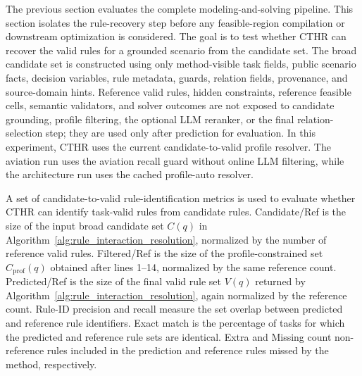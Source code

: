 ﻿\documentclass[a4paper,fleqn]{cas-dc}
\newcommand{\CTHR}{\textsc{CTHR}}
\begin{document}
The previous section evaluates the complete modeling-and-solving pipeline. This
section isolates the rule-recovery step before any feasible-region compilation
or downstream optimization is considered. The goal is to test whether \CTHR{}
can recover the valid rules for a grounded scenario from the candidate set. The
broad candidate set is constructed using only method-visible task fields,
public scenario facts, decision variables, rule metadata, guards, relation
fields, provenance, and source-domain hints. Reference valid rules, hidden
constraints, reference feasible cells, semantic validators, and solver outcomes
are not exposed to candidate grounding, profile filtering, the optional LLM
reranker, or the final relation-selection step; they are used only after
prediction for evaluation. In this experiment, \CTHR{} uses the current
candidate-to-valid profile resolver. The aviation run uses the aviation recall
guard without online LLM filtering, while the architecture run uses the cached
profile-auto resolver.

A set of candidate-to-valid rule-identification metrics is used to evaluate whether CTHR can identify task-valid rules from candidate rules. Candidate/Ref is the size of the input broad candidate set $C(q)$ in Algorithm~\ref{alg:rule_interaction_resolution}, normalized by the number of reference valid rules. Filtered/Ref is the size of the profile-constrained set $C_{\mathrm{prof}}(q)$ obtained after lines 1--14, normalized by the same reference count. Predicted/Ref is the size of the final valid rule set $V(q)$ returned by Algorithm~\ref{alg:rule_interaction_resolution}, again normalized by the reference count. Rule-ID precision and recall measure the set overlap between predicted and reference rule identifiers. Exact match is the percentage of tasks for which the predicted and reference rule sets are identical. Extra and Missing count non-reference rules included in the prediction and reference rules missed by the method, respectively.
\end{document}
